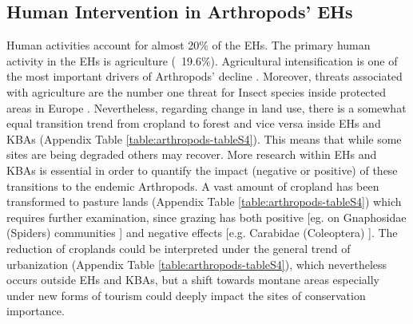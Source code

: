     \subsection{Human Intervention in Arthropods’ EHs}
    \label{subsec:arthropods-human-intervention-ehs}
Human activities account for almost 20\% of the EHs. The primary human activity
in the EHs is agriculture (~19.6\%). Agricultural intensification is one of the
most important drivers of Arthropods’ decline \parencite{bruhl2019biodiversity,habel2019agricultural,raven2021agricultural}.
Moreover, threats associated with agriculture are the number one threat for
Insect species inside protected areas in Europe \parencite{chowdhury2023protected}.
Nevertheless, regarding change in land use, there is a somewhat equal
transition trend from cropland to forest and vice versa inside EHs and KBAs
(Appendix Table \ref{table:arthropods-tableS4}). This means that while some sites are being
degraded others may recover. More research within EHs and KBAs is essential in
order to quantify the impact (negative or positive) of these transitions to the
endemic Arthropods. A vast amount of cropland has been transformed to pasture
lands (Appendix Table \ref{table:arthropods-tableS4}) which requires further examination,
since grazing has both positive [eg. on Gnaphosidae (Spiders) communities \parencite{kaltsas2019overgrazed}]
and negative effects [e.g. Carabidae (Coleoptera) \parencite{kaltsas2013ground}].
The reduction of croplands could be interpreted under the general trend of
urbanization (Appendix Table \ref{table:arthropods-tableS4}), which nevertheless occurs
outside EHs and KBAs, but a shift towards montane areas especially under new
forms of tourism could deeply impact the sites of conservation importance.
    


